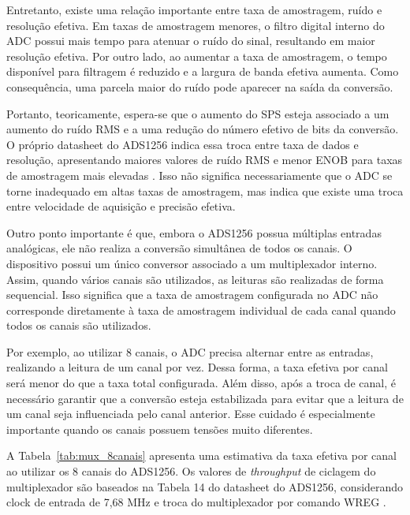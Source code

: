 \documentclass[12pt, a4paper]{article}
\begin{document}
Entretanto, existe uma relação importante entre taxa de amostragem, ruído e resolução efetiva. 
Em taxas de amostragem menores, o filtro digital interno do ADC possui mais tempo para atenuar o ruído do sinal, resultando em maior resolução efetiva. 
Por outro lado, ao aumentar a taxa de amostragem, o tempo disponível para filtragem é reduzido e a largura de banda efetiva aumenta. Como consequência, uma parcela maior do ruído pode aparecer na saída da conversão.

Portanto, teoricamente, espera-se que o aumento do SPS esteja associado a um aumento do ruído RMS e a uma redução do número efetivo de bits da conversão. 
O próprio datasheet do ADS1256 indica essa troca entre taxa de dados e resolução, apresentando maiores valores de ruído RMS e menor ENOB para taxas de amostragem mais elevadas \cite{datasheet_ads1256}. 
Isso não significa necessariamente que o ADC se torne inadequado em altas taxas de amostragem, mas indica que existe uma troca entre velocidade de aquisição e precisão efetiva.

Outro ponto importante é que, embora o ADS1256 possua múltiplas entradas analógicas, ele não realiza a conversão simultânea de todos os canais. 
O dispositivo possui um único conversor associado a um multiplexador interno. Assim, quando vários canais são utilizados, as leituras são realizadas de forma sequencial. 
Isso significa que a taxa de amostragem configurada no ADC não corresponde diretamente à taxa de amostragem individual de cada canal quando todos os canais são utilizados.

Por exemplo, ao utilizar 8 canais, o ADC precisa alternar entre as entradas, realizando a leitura de um canal por vez. 
Dessa forma, a taxa efetiva por canal será menor do que a taxa total configurada. 
Além disso, após a troca de canal, é necessário garantir que a conversão esteja estabilizada para evitar que a leitura de um canal seja influenciada pelo canal anterior. 
Esse cuidado é especialmente importante quando os canais possuem tensões muito diferentes.

A Tabela~\ref{tab:mux_8canais} apresenta uma estimativa da taxa efetiva por canal ao utilizar os 8 canais do ADS1256. 
Os valores de \textit{throughput} de ciclagem do multiplexador são baseados na Tabela 14 do datasheet do ADS1256, 
considerando clock de entrada de 7,68 MHz e troca do multiplexador por comando WREG \cite{datasheet_ads1256, ti_e2e_fastcycling}.
\end{document}
